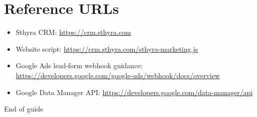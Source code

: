 \documentclass[11pt,a4paper]{article}
\begin{document}
\section{Reference URLs}

\begin{itemize}
  \item Sthyra CRM: \url{https://crm.sthyra.com}
  \item Website script: \url{https://crm.sthyra.com/sthyra-marketing.js}
  \item Google Ads lead-form webhook guidance: \url{https://developers.google.com/google-ads/webhook/docs/overview}
  \item Google Data Manager API: \url{https://developers.google.com/data-manager/api}
\end{itemize}

\vfill
\begin{center}
  \textcolor{Muted}{End of guide}
\end{center}
\end{document}
